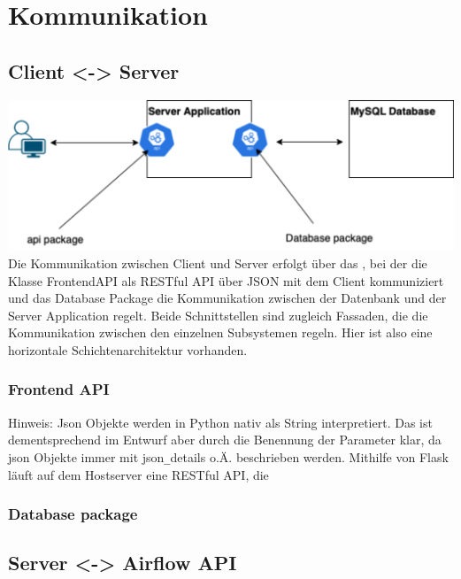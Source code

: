 \section{Kommunikation}

\subsection{Client <-> Server} 
\includegraphics[width=1\textwidth]{res/Kommunikation.png}
Die Kommunikation zwischen Client und Server erfolgt über das , bei der die Klasse FrontendAPI 
als RESTful API über JSON mit dem Client kommuniziert und das Database Package die Kommunikation 
zwischen der Datenbank und der Server Application regelt. Beide Schnittstellen sind zugleich Fassaden, die die Kommunikation
zwischen den einzelnen Subsystemen regeln.
Hier ist also eine horizontale Schichtenarchitektur vorhanden.

\subsubsection{Frontend API}
Hinweis: Json Objekte werden in Python nativ als String interpretiert. Das ist dementsprechend im Entwurf aber durch die 
Benennung der Parameter klar, da json Objekte immer mit json\texttt{\_}details o.Ä. beschrieben werden.
Mithilfe von Flask läuft auf dem Hostserver eine RESTful API, die 

\subsubsection{Database package}
\subsection{Server <-> Airflow API}

\newpage